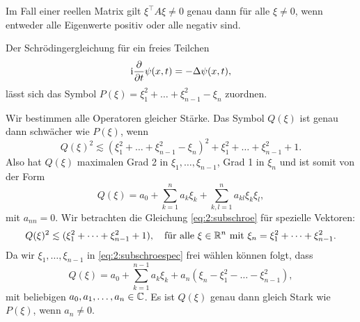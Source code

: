 \begin{exa}
Im Fall einer reellen Matrix gilt $\xi^\top A\xi\neq0$ genau dann für alle $\xi\neq0$,
wenn entweder alle Eigenwerte positiv oder alle negativ sind.
\end{exa}

\begin{exa}\label{exa:2:schroe}
Der Schrödingergleichung für ein freies Teilchen
\begin{equation}
\mathrm i\frac{\partial}{\partial t}\psi(x,t)=-\Delta\psi(x,t),\end{equation}
lässt sich das Symbol $P(\xi)=\xi^2_1+\dots+\xi^2_{n-1}-\xi_n$ zuordnen.

Wir bestimmen alle Operatoren gleicher Stärke.
Das Symbol $Q(\xi)$ ist genau dann schwächer wie $P(\xi)$,
wenn
\begin{equation}\label{eq:2:subschroe}
Q(\xi)^2\apprle(\xi^2_1+\dots+\xi^2_{n-1}-\xi_n)^2+\xi^2_1+\dots+\xi^2_{n-1}+1.
\end{equation}
Also hat $Q(\xi)$ maximalen Grad 2 in $\xi_1,\dots,\xi_{n-1}$,
Grad 1 in $\xi_n$ und ist somit von der Form
\begin{equation}
Q(\xi)=a_0+\sum^n_{k=1}a_k\xi_k+\sum^n_{k,l=1}a_{kl}\xi_k\xi_l,
\end{equation}
mit $a_{nn}=0$.
Wir betrachten die Gleichung \eqref{eq:2:subschroe}
für spezielle Vektoren:
\begin{equation}\label{eq:2:subschroespec}
Q(\xi)^2\apprle(\xi^2_1+\dots+\xi^2_{n-1}+1),
\quad\text{für alle}~\xi\in\R^n~\text{mit}~\xi_n=\xi^2_1+\dots+\xi^2_{n-1}.
\end{equation}
Da wir $\xi_1,\dots,\xi_{n-1}$ in \eqref{eq:2:subschroespec} frei wählen können folgt, dass
\begin{equation}
Q(\xi)=a_0+\sum_{k=1}^{n-1}a_k\xi_k+a_n(\xi_n-\xi^2_1-\dots-\xi^2_{n-1}),
\end{equation}
mit beliebigen $a_0,a_1,\dots,a_n\in\mathbb C$.
Es ist $Q(\xi)$ genau dann gleich Stark wie $P(\xi)$,
wenn $a_n\neq0$.
\end{exa}

